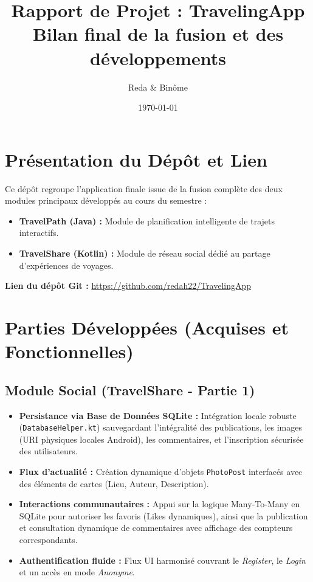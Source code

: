\documentclass[11pt,a4paper]{article}
\title{\textbf{\textcolor{primary}{Rapport de Projet : TravelingApp}} \\ \large Bilan final de la fusion et des développements}
\author{Reda \& Binôme}
\date{\today}
\begin{document}
\maketitle
\thispagestyle{empty}

\vspace{1cm}

\section{Présentation du Dépôt et Lien}
Ce dépôt regroupe l'application finale issue de la fusion complète des deux modules principaux développés au cours du semestre :
\begin{itemize}
    \item \textbf{TravelPath (Java) :} Module de planification intelligente de trajets interactifs.
    \item \textbf{TravelShare (Kotlin) :} Module de réseau social dédié au partage d'expériences de voyages.
\end{itemize}

\vspace{0.5cm}
\noindent \textbf{Lien du dépôt Git :} \url{https://github.com/redah22/TravelingApp}
\vspace{1cm}

\section{Parties Développées (Acquises et Fonctionnelles)}

\subsection{Module Social (TravelShare - Partie 1)}
\begin{itemize}[label=\textcolor{primary}{\textbullet}]
    \item \textbf{Persistance via Base de Données SQLite :} Intégration locale robuste (\texttt{DatabaseHelper.kt}) sauvegardant l'intégralité des publications, les images (URI physiques locales Android), les commentaires, et l'inscription sécurisée des utilisateurs.
    \item \textbf{Flux d'actualité :} Création dynamique d'objets \texttt{PhotoPost} interfacés avec des éléments de cartes (Lieu, Auteur, Description).
    \item \textbf{Interactions communautaires :} Appui sur la logique Many-To-Many en SQLite pour autoriser les favoris (Likes dynamiques), ainsi que la publication et consultation dynamique de commentaires avec affichage des compteurs correspondants.
    \item \textbf{Authentification fluide :} Flux UI harmonisé couvrant le \textit{Register}, le \textit{Login} et un accès en mode \textit{Anonyme}.
\end{itemize}
\end{document}
